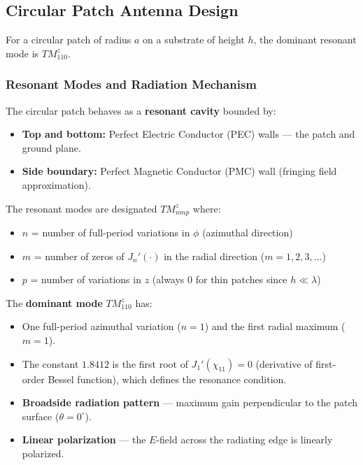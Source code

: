 \documentclass[12pt,a4paper]{article}
\begin{document}
\subsection{Circular Patch Antenna Design}
For a circular patch of radius $a$ on a substrate of height $h$, the dominant resonant mode is $TM^z_{110}$.

\subsubsection*{Resonant Modes and Radiation Mechanism}
The circular patch behaves as a \textbf{resonant cavity} bounded by:
\begin{itemize}[leftmargin=*, itemsep=2pt]
  \item \textbf{Top and bottom:} Perfect Electric Conductor (PEC) walls — the patch and ground plane.
  \item \textbf{Side boundary:} Perfect Magnetic Conductor (PMC) wall (fringing field approximation).
\end{itemize}
The resonant modes are designated $TM^z_{nmp}$ where:
\begin{itemize}[leftmargin=*, itemsep=2pt]
  \item $n$ = number of full-period variations in $\phi$ (azimuthal direction)
  \item $m$ = number of zeros of $J_n'(\cdot)$ in the radial direction ($m = 1, 2, 3, \dots$)
  \item $p$ = number of variations in $z$ (always $0$ for thin patches since $h \ll \lambda$)
\end{itemize}

The \textbf{dominant mode} $TM^z_{110}$ has:
\begin{itemize}[leftmargin=*, itemsep=2pt]
  \item One full-period azimuthal variation ($n=1$) and the first radial maximum ($m=1$).
  \item The constant $1.8412$ is the first root of $J_1'(\chi_{11}) = 0$ (derivative of first-order Bessel function), which defines the resonance condition.
  \item \textbf{Broadside radiation pattern} — maximum gain perpendicular to the patch surface ($\theta = 0^\circ$).
  \item \textbf{Linear polarization} — the $E$-field across the radiating edge is linearly polarized.
\end{itemize}
\end{document}

